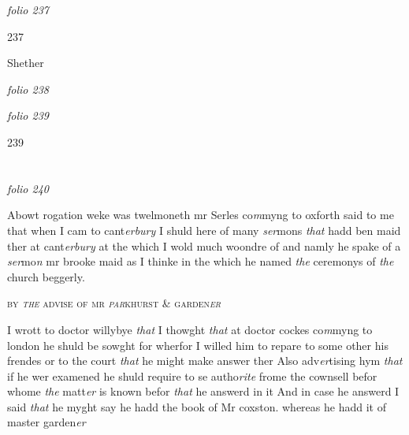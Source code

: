 \documentclass[12pt, a4paper]{book}
\begin{document}
\textit{folio 237}



\begin{flushright}{\color{Mahogany}237}\end{flushright}

				\marginpar[\vspace{0.5cm}{\textcolor{Gray}{D.}}]{}
			 
		\ifthenelse{\isodd{\thepage}}
		{\reversemarginpar}
		{\normalmarginpar}
		Shether

\dotfill
						\newpage
{}

\textit{folio 238}


         \vspace*{4cm}
         
\dotfill
						

\textit{folio 239}


\begin{flushright}{\color{Mahogany}239}\end{flushright}

\dotfill
						\newpage {} \section*{}  \subsection*{}

\textit{folio 240}



		\ifthenelse{\isodd{\thepage}}
		{\reversemarginpar}
		{\normalmarginpar}
		Abowt rogation weke was twelmoneth mr Serles co\textit{m}myng to
oxforth said to me that when I cam to cant\textit{erbury} I shuld here of many
\textit{ser}mons \textit{that} hadd ben maid ther at cant\textit{erbury} at the which I wold much
woondre of and namly he spake of a \textit{ser}mo\textit{n} mr brooke maid as I
thinke in the which he named \textit{the} ceremonys of \textit{the} church beggerly.
            		
				\begin{center}  {\scshape by \textit{the} advise of mr \textit{par}khurst \& garden\textit{er}}  \end{center}
			
            			
		\ifthenelse{\isodd{\thepage}}
		{\reversemarginpar}
		{\normalmarginpar}
		I wrott to doctor willybye \textit{that} I thowght \textit{that} at doctor cockes co\textit{m}myng
to london he shuld be sowght for wherfor I willed him to repare
to some other his frendes or to the court \textit{that} he might make answer
ther Also adv\textit{er}tising hym \textit{that} if he wer examened he shuld require
to se autho\textit{rite} frome the cownsell befor whome \textit{the} matt\textit{er} is known
befor \textit{that} he answerd in it And in case he answerd I said \textit{that} he
myght say he hadd the book of Mr coxston. whereas he hadd it of 
            				master garden\textit{er}
            			
\end{document}
